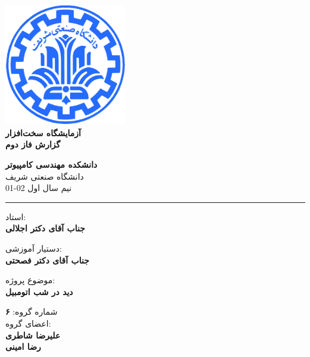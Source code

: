 \documentclass[12pt]{article}
\begin{document}
\begin{titlepage}
\begin{center}
        
\vspace*{0.7cm}

\includegraphics[width=0.4\textwidth]{sharif1.png}\\
\vspace{0.5cm}
\textbf{ \Huge{\emph ‌آزمایشگاه سخت‌افزار} }\\
\vspace{0.5cm}
\textbf{ \Large{گزارش فاز دوم} }
\vspace{0.2cm}
       
 
      \large \textbf{دانشکده مهندسی کامپیوتر}\\\vspace{0.2cm}
    \large   دانشگاه صنعتی شریف\\\vspace{0.2cm}
       \large   ﻧﯿﻢ سال اول 02-01 \\\vspace{0.2cm}
      \noindent\rule[1ex]{\linewidth}{1pt}
استاد:\\
    \textbf{{جناب آقای دکتر اجلالی}}


دستیار آموزشی:\\
\textbf{{جناب آقای دکتر فصحتی}}

    \vspace{0.25cm}
    
    موضوع پروژه:\\
    
    \textbf{دید در شب اتومبیل}
    
    \vspace{0.35cm}
    
    
        شماره گروه:
    \textbf{{۶}}\\
    
اعضای گروه:\\

    \textbf{{علیرضا شاطری}}
    \\
   
     \textbf{{رضا امینی}}   
\end{center}
\end{titlepage}
\end{document}
